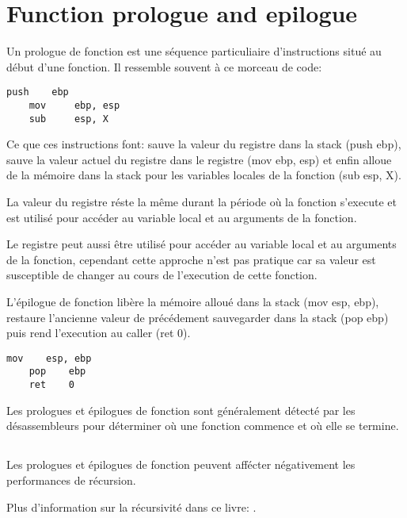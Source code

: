 \section{Function prologue and epilogue}
\label{sec:prologepilog}

Un prologue de fonction est une séquence particuliaire d'instructions situé au début d'une fonction. Il ressemble souvent à ce morceau de code:

\begin{lstlisting}[style=customasmx86]
    push    ebp
    mov     ebp, esp
    sub     esp, X
\end{lstlisting}

Ce que ces instructions font: sauve la valeur du registre \EBP dans la stack (push ebp), sauve la valeur actuel du registre \ESP dans le registre \EBP (mov ebp, esp) et enfin alloue de la mémoire dans la stack pour les variables locales de la fonction (sub esp, X).

La valeur du registre \EBP réste la même durant la période où la fonction s'execute et est utilisé pour accéder au variable local et au arguments de la fonction.

Le registre \ESP peut aussi être utilisé pour accéder au variable local et au arguments de la fonction, cependant cette approche n'est pas pratique car sa valeur est susceptible de changer au cours de l'execution de cette fonction.

L'épilogue de fonction libère la mémoire alloué dans la stack (mov esp, ebp), restaure l'ancienne valeur de \EBP précédement sauvegarder dans la stack (pop ebp) puis rend l'execution au \gls{caller} (ret 0).

\begin{lstlisting}[style=customasmx86]
    mov    esp, ebp
    pop    ebp
    ret    0
\end{lstlisting}

Les prologues et épilogues de fonction sont généralement détecté par les désassembleurs pour déterminer où une fonction commence et où elle se termine. 

\subsection{\Recursion}

\myindex{\Recursion}
Les prologues et épilogues de fonction peuvent affécter négativement les performances de récursion.

Plus d'information sur la récursivité dans ce livre: .
